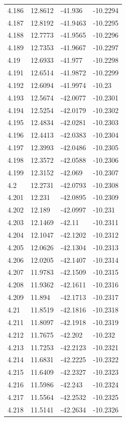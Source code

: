 \begin{tabular}{llll}
4.186 & 12.8612 & -41.936 & -10.2294 \\
4.187 & 12.8192 & -41.9463 & -10.2295 \\
4.188 & 12.7773 & -41.9565 & -10.2296 \\
4.189 & 12.7353 & -41.9667 & -10.2297 \\
4.19 & 12.6933 & -41.977 & -10.2298 \\
4.191 & 12.6514 & -41.9872 & -10.2299 \\
4.192 & 12.6094 & -41.9974 & -10.23 \\
4.193 & 12.5674 & -42.0077 & -10.2301 \\
4.194 & 12.5254 & -42.0179 & -10.2302 \\
4.195 & 12.4834 & -42.0281 & -10.2303 \\
4.196 & 12.4413 & -42.0383 & -10.2304 \\
4.197 & 12.3993 & -42.0486 & -10.2305 \\
4.198 & 12.3572 & -42.0588 & -10.2306 \\
4.199 & 12.3152 & -42.069 & -10.2307 \\
4.2 & 12.2731 & -42.0793 & -10.2308 \\
4.201 & 12.231 & -42.0895 & -10.2309 \\
4.202 & 12.189 & -42.0997 & -10.231 \\
4.203 & 12.1469 & -42.11 & -10.2311 \\
4.204 & 12.1047 & -42.1202 & -10.2312 \\
4.205 & 12.0626 & -42.1304 & -10.2313 \\
4.206 & 12.0205 & -42.1407 & -10.2314 \\
4.207 & 11.9783 & -42.1509 & -10.2315 \\
4.208 & 11.9362 & -42.1611 & -10.2316 \\
4.209 & 11.894 & -42.1713 & -10.2317 \\
4.21 & 11.8519 & -42.1816 & -10.2318 \\
4.211 & 11.8097 & -42.1918 & -10.2319 \\
4.212 & 11.7675 & -42.202 & -10.232 \\
4.213 & 11.7253 & -42.2123 & -10.2321 \\
4.214 & 11.6831 & -42.2225 & -10.2322 \\
4.215 & 11.6409 & -42.2327 & -10.2323 \\
4.216 & 11.5986 & -42.243 & -10.2324 \\
4.217 & 11.5564 & -42.2532 & -10.2325 \\
4.218 & 11.5141 & -42.2634 & -10.2326 \\

\end{tabular}

